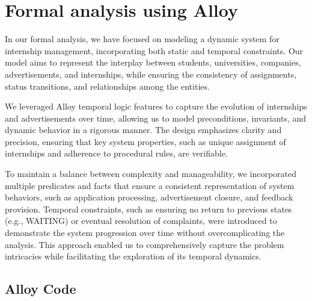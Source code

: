 


\chapter{Formal analysis using Alloy}

In our formal analysis, we have focused on modeling a dynamic system for internship management,
incorporating both static and temporal constraints. Our model aims to represent the interplay between students,
universities, companies, advertisements, and internships, while ensuring the consistency of assignments,
status transitions, and relationships among the entities.

We leveraged Alloy temporal logic features to capture the evolution of internships and advertisements over time,
allowing us to model preconditions, invariants, and dynamic behavior in a rigorous manner.
The design emphasizes clarity and precision, ensuring that key system properties, such as unique assignment
of internships and adherence to procedural rules, are verifiable.

To maintain a balance between complexity and manageability, we incorporated multiple predicates and facts
that ensure a consistent representation of system behaviors, such as application processing, advertisement closure,
and feedback provision. Temporal constraints, such as ensuring no return to previous states (e.g., WAITING)
or eventual resolution of complaints, were introduced to demonstrate the system progression over time without
overcomplicating the analysis. This approach enabled us to comprehensively capture the problem intricacies while
facilitating the exploration of its temporal dynamics.

\section{Alloy Code}

